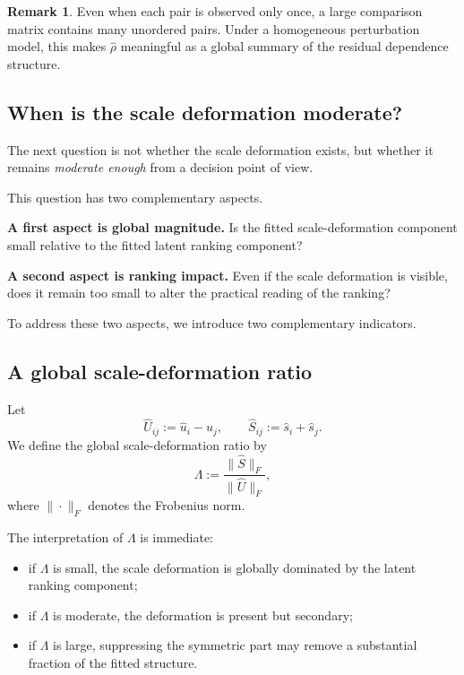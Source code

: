 \documentclass[11pt]{amsart}
\theoremstyle{definition}
\newtheorem{remark}[definition]{Remark}
\theoremstyle{plain}
\numberwithin{equation}{section}
\begin{document}
\begin{remark}
Even when each pair is observed only once, a large comparison matrix contains many unordered pairs. Under a homogeneous perturbation model, this makes $\widehat\rho$ meaningful as a global summary of the residual dependence structure.
\end{remark}

\subsection{When is the scale deformation moderate?}

The next question is not whether the scale deformation exists, but whether it remains \emph{moderate enough} from a decision point of view.

This question has two complementary aspects.

\medskip

\noindent\textbf{A first aspect is global magnitude.}
Is the fitted scale-deformation component small relative to the fitted latent ranking component?

\medskip

\noindent\textbf{A second aspect is ranking impact.}
Even if the scale deformation is visible, does it remain too small to alter the practical reading of the ranking?

To address these two aspects, we introduce two complementary indicators.

\subsection{A global scale-deformation ratio}

Let
\[
\widehat U_{ij}:=\widehat u_i-\widehat u_j,
\qquad
\widehat S_{ij}:=\widehat s_i+\widehat s_j.
\]
We define the global scale-deformation ratio by
\begin{equation}\label{eq:Lambdacorr}
\Lambda
:=
\frac{\|\widehat S\|_F}{\|\widehat U\|_F},
\end{equation}
where $\|\cdot\|_F$ denotes the Frobenius norm.

The interpretation of $\Lambda$ is immediate:
\begin{itemize}
\item if $\Lambda$ is small, the scale deformation is globally dominated by the latent ranking component;
\item if $\Lambda$ is moderate, the deformation is present but secondary;
\item if $\Lambda$ is large, suppressing the symmetric part may remove a substantial fraction of the fitted structure.
\end{itemize}
\end{document}
